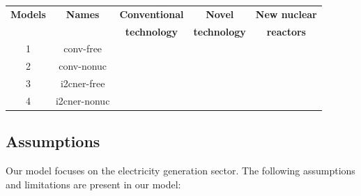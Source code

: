 \documentclass[14pt,a4paper]{article} %
\newcommand{\greencheck}{{\color{green}\checkmark}}
\newcommand{\xmark}{{\color{red}\ding{55}}}
\begin{document}
\begin{tabular}{| c | c | c | c | c |}
\hline
\textbf{Models}& \textbf{Names}&\textbf{Conventional}&\textbf{Novel}&\textbf{New nuclear}\\
                 &             &\textbf{technology}&\textbf{technology}&\textbf{reactors}\\
                  \hline
1               & conv-free &      \greencheck           &         \xmark       &      \greencheck     \\ 
2               & conv-nonuc &      \greencheck           &         \xmark       &         \xmark       \\ 
3               & i2cner-free &      \greencheck           &      \greencheck     &      \greencheck     \\ 
4               & i2cner-nonuc &      \greencheck           &      \greencheck     &         \xmark       \\
\hline
\end{tabular}

\subsection{Assumptions}

	Our model focuses on the electricity generation sector. The following assumptions and limitations are present in our model:
	
\end{document}
